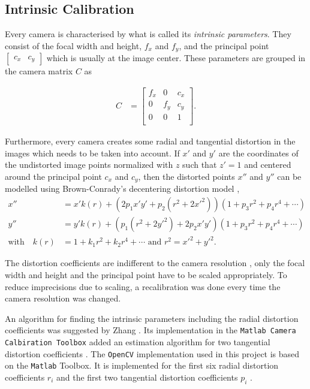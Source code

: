 
\subsection{Intrinsic Calibration}
\label{sec:intrinsic}

Every camera is characterised by what is called its \textit{intrinsic parameters}. They consist of the focal width and height, $f_x$ and $f_y$, and the principal point $\begin{bmatrix} c_x &  c_y\end{bmatrix}$ which is usually at the image center. These parameters are grouped in the camera matrix $C$ as

\begin{align}
    C &= \begin{bmatrix}
        f_x & 0 & c_x \\
        0 & f_y & c_y \\
        0 & 0 & 1 \\
    \end{bmatrix}.
\end{align}

Furthermore, every camera creates some radial and tangential distortion in the images which needs to be taken into account. 
If $x'$ and $y'$ are the coordinates of the undistorted image points normalized with $z$ such that $z'=1$ and centered around the principal point $c_x$ and $c_y$, then the distorted points $x''$ and $y''$ can be modelled using Brown-Conrady's decentering distortion model \cite{Brown1966}, \cite{Conrady1919}
\begin{align}
    x'' &= x' k(r) + (2p_1 x' y' + p_2(r^2 + 2x'^2))(1+p_3r^2+p_4r^4 + \cdots) \\
    y'' &= y' k(r) + (p_1(r^2+2y'^2) + 2p_2x'y')(1+p_3r^2+p_4r^4 + \cdots) \\
    \text{with} \quad k(r) &= 1+k_1r^2+k_2r^4 + \cdots \text{  and } r^2=x'^2+y'^2.
\end{align}

The distortion coefficients are indifferent to the camera resolution \cite{calib3d}, only the focal width and height and the principal point have to be scaled appropriately. To reduce imprecisions due to scaling, a recalibration was done every time the camera resolution was changed.

An algorithm for finding the intrinsic parameters including the radial distortion coefficients was suggested by Zhang \cite{Zhang2000}. 
Its implementation in the \texttt{Matlab Camera Calbiration Toolbox} added an estimation algorithm for two tangential distortion coefficients \cite{MTB}.
The \texttt{OpenCV} implementation used in this project is based on the \texttt{Matlab} Toolbox. 
It is implemented for the first six radial distortion coefficients $r_i$ and the first two tangential distortion coefficients $p_i$ \cite{calib3d}.

